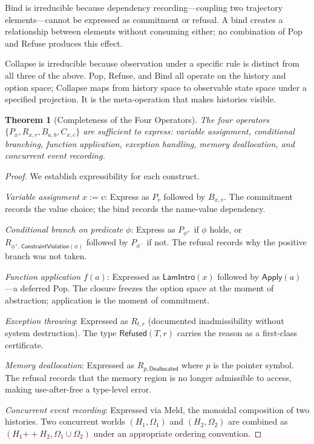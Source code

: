 \documentclass[12pt, a4paper, openany]{book}
\theoremstyle{plain}
\newtheorem{theorem}{Theorem}[chapter]
\theoremstyle{definition}
\theoremstyle{remark}
\newcommand{\Rfsd}{\mathsf{Refused}}
\begin{document}
Bind is irreducible because dependency recording---coupling two trajectory
elements---cannot be expressed as commitment or refusal. A bind creates a
relationship between elements without consuming either; no combination of Pop
and Refuse produces this effect.

Collapse is irreducible because observation under a specific rule is distinct from
all three of the above. Pop, Refuse, and Bind all operate on the history and
option space; Collapse maps from history space to observable state space under
a specified projection. It is the meta-operation that makes histories visible.

\begin{theorem}[Completeness of the Four Operators]
\label{thm:completeness}
The four operators $\{P_x, R_{x,r}, B_{a,b}, C_{x,c}\}$ are sufficient to express:
variable assignment, conditional branching, function application, exception
handling, memory deallocation, and concurrent event recording.
\end{theorem}

\begin{proof}
We establish expressibility for each construct.

\textit{Variable assignment $x := v$}: Express as $P_v$ followed by $B_{x,v}$.
The commitment records the value choice; the bind records the name-value
dependency.

\textit{Conditional branch on predicate $\phi$}: Express as $P_{\phi^+}$ if $\phi$
holds, or $R_{\phi^+,\mathsf{ConstraintViolation}(\phi)}$ followed by
$P_{\phi^-}$ if not. The refusal records why the positive branch was not taken.

\textit{Function application $f(a)$}: Expressed as $\mathsf{LamIntro}(x)$ followed
by $\mathsf{Apply}(a)$---a deferred Pop. The closure freezes the option space at
the moment of abstraction; application is the moment of commitment.

\textit{Exception throwing}: Expressed as $R_{t, r}$ (documented inadmissibility
without system destruction). The type $\Rfsd(T, r)$ carries the reason as a
first-class certificate.

\textit{Memory deallocation}: Expressed as $R_{p, \mathsf{Deallocated}}$ where
$p$ is the pointer symbol. The refusal records that the memory region is no longer
admissible to access, making use-after-free a type-level error.

\textit{Concurrent event recording}: Expressed via Meld, the monoidal composition
of two histories. Two concurrent worlds $(H_1, \Omega_1)$ and $(H_2, \Omega_2)$
are combined as $(H_1 \mathbin{++} H_2, \Omega_1 \cup \Omega_2)$ under an
appropriate ordering convention.
\end{proof}
\end{document}
